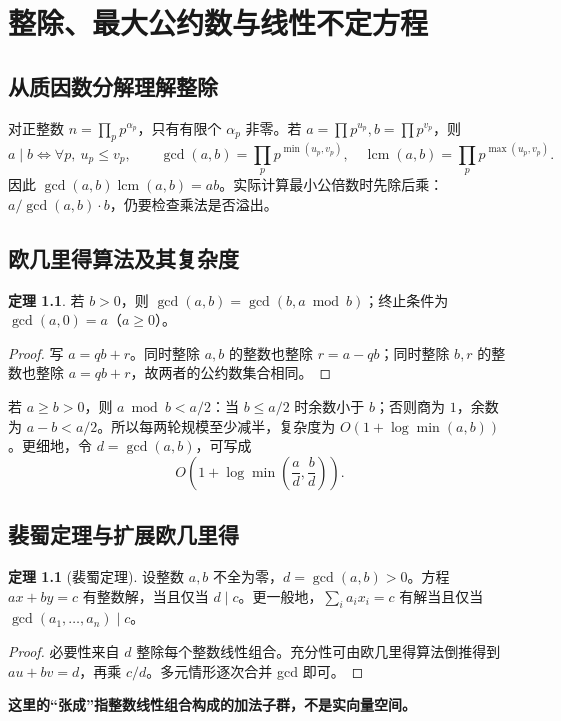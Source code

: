 \documentclass[UTF8,a4paper,11pt,oneside,openany,fontset=fandol]{ctexbook}
\theoremstyle{definition}
\newtheorem{theorem}[definition]{定理}
\newcommand{\lcm}{\operatorname{lcm}}
\begin{document}
\tableofcontents
\mainmatter


\chapter{整除、最大公约数与线性不定方程}
\section{从质因数分解理解整除}
对正整数 $n=\prod_p p^{\alpha_p}$，只有有限个 $\alpha_p$ 非零。若 $a=\prod p^{u_p},b=\prod p^{v_p}$，则
\[
 a\mid b\iff\forall p,\ u_p\le v_p,\qquad
 \gcd(a,b)=\prod_p p^{\min(u_p,v_p)},\quad
 \lcm(a,b)=\prod_p p^{\max(u_p,v_p)}.
\]
因此 $\gcd(a,b)\lcm(a,b)=ab$。实际计算最小公倍数时先除后乘：$a/\gcd(a,b)\cdot b$，仍要检查乘法是否溢出。



\section{欧几里得算法及其复杂度}
\begin{theorem}
若 $b>0$，则 $\gcd(a,b)=\gcd(b,a\bmod b)$；终止条件为 $\gcd(a,0)=a$（$a\ge0$）。
\end{theorem}
\begin{proof}
写 $a=qb+r$。同时整除 $a,b$ 的整数也整除 $r=a-qb$；同时整除 $b,r$ 的整数也整除 $a=qb+r$，故两者的公约数集合相同。
\end{proof}
若 $a\ge b>0$，则 $a\bmod b<a/2$：当 $b\le a/2$ 时余数小于 $b$；否则商为 $1$，余数为 $a-b<a/2$。所以每两轮规模至少减半，复杂度为 $O(1+\log\min(a,b))$。更细地，令 $d=\gcd(a,b)$，可写成
\[
 O\!\left(1+\log\min\left(\frac ad,\frac bd\right)\right).
\]



\section{裴蜀定理与扩展欧几里得}
\begin{theorem}[裴蜀定理]
设整数 $a,b$ 不全为零，$d=\gcd(a,b)>0$。方程 $ax+by=c$ 有整数解，当且仅当 $d\mid c$。更一般地，$\sum_i a_ix_i=c$ 有解当且仅当 $\gcd(a_1,\ldots,a_n)\mid c$。
\end{theorem}
\begin{proof}
必要性来自 $d$ 整除每个整数线性组合。充分性可由欧几里得算法倒推得到 $au+bv=d$，再乘 $c/d$。多元情形逐次合并 gcd 即可。
\end{proof}
\textbf{这里的“张成”指整数线性组合构成的加法子群，不是实向量空间。}
\end{document}
